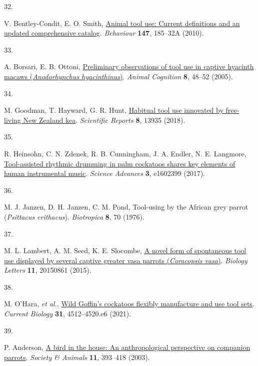 \documentclass[
  man, donotrepeattitle,floatsintext]{apa6}
\newlength{\cslhangindent}
\newlength{\csllabelwidth}
\newlength{\cslentryspacingunit} %
\newenvironment{CSLReferences}[2] %
 {%
  \setlength{\parindent}{0pt}
  \ifodd #1
  \let\oldpar\par
  \def\par{\hangindent=\cslhangindent\oldpar}
  \fi
  \setlength{\parskip}{#2\cslentryspacingunit}
 }%
 {}
\newcommand{\CSLLeftMargin}[1]{\parbox[t]{\csllabelwidth}{#1}}
\newcommand{\CSLRightInline}[1]{\parbox[t]{\linewidth - \csllabelwidth}{#1}\break}
\begin{document}
\begin{CSLReferences}{0}{0}
\leavevmode{}%
\CSLLeftMargin{32. }%
\CSLRightInline{V. Bentley-Condit, E. O. Smith, \href{https://doi.org/10.1163/000579509X12512865686555}{Animal tool use: Current definitions and an updated comprehensive catalog}. \emph{Behaviour} \textbf{147}, 185--32A (2010).}

\leavevmode{}%
\CSLLeftMargin{33. }%
\CSLRightInline{A. Borsari, E. B. Ottoni, \href{https://doi.org/10.1007/s10071-004-0221-3}{Preliminary observations of tool use in captive hyacinth macaws (\emph{{A}nodorhynchus hyacinthinus})}. \emph{Animal Cognition} \textbf{8}, 48--52 (2005).}

\leavevmode{}%
\CSLLeftMargin{34. }%
\CSLRightInline{M. Goodman, T. Hayward, G. R. Hunt, \href{https://doi.org/10.1038/s41598-018-32363-9}{Habitual tool use innovated by free-living {N}ew {Z}ealand kea}. \emph{Scientific Reports} \textbf{8}, 13935 (2018).}

\leavevmode{}%
\CSLLeftMargin{35. }%
\CSLRightInline{R. Heinsohn, C. N. Zdenek, R. B. Cunningham, J. A. Endler, N. E. Langmore, \href{https://doi.org/10.1126/sciadv.1602399}{Tool-assisted rhythmic drumming in palm cockatoos shares key elements of human instrumental music}. \emph{Science Advances} \textbf{3}, e1602399 (2017).}

\leavevmode{}%
\CSLLeftMargin{36. }%
\CSLRightInline{M. J. Janzen, D. H. Janzen, C. M. Pond, Tool-using by the {A}frican grey parrot (\emph{{P}sittacus erithacus}). \emph{Biotropica} \textbf{8}, 70 (1976).}

\leavevmode{}%
\CSLLeftMargin{37. }%
\CSLRightInline{M. L. Lambert, A. M. Seed, K. E. Slocombe, \href{https://doi.org/10.1098/rsbl.2015.0861}{A novel form of spontaneous tool use displayed by several captive greater vasa parrots (\emph{{C}oracopsis vasa})}. \emph{Biology Letters} \textbf{11}, 20150861 (2015).}

\leavevmode{}%
\CSLLeftMargin{38. }%
\CSLRightInline{M. O'Hara, \emph{et al.}, \href{https://doi.org/10.1016/j.cub.2021.08.009}{Wild {G}offin's cockatoos flexibly manufacture and use tool sets}. \emph{Current Biology} \textbf{31}, 4512--4520.e6 (2021).}

\leavevmode{}%
\CSLLeftMargin{39. }%
\CSLRightInline{P. Anderson, \href{https://doi.org/10.1163/156853003322796109}{A bird in the house: An anthropological perspective on companion parrots}. \emph{Society \& Animals} \textbf{11}, 393--418 (2003).}


\end{CSLReferences}
\end{document}

